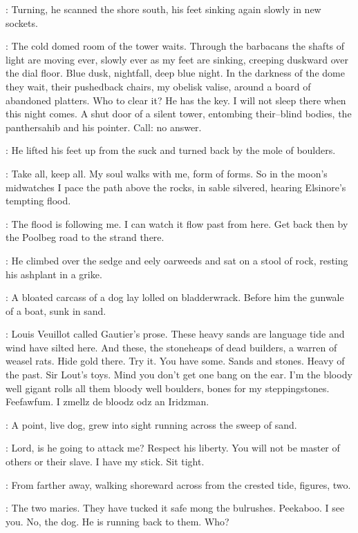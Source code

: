 :
Turning, he scanned the shore south,
his feet sinking again slowly in new sockets.

\StephenInt:
The cold domed room of the tower waits.
Through the barbacans
the shafts of light are moving ever,
slowly ever as my feet are sinking,
creeping duskward over the dial floor.
Blue dusk, nightfall, deep blue night.
In the darkness of the dome
they wait, their pushedback chairs,
my obelisk valise,
around a board of abandoned platters.
Who to clear it?
He has the key.
I will not sleep there when this night comes.
A shut door of a silent tower,
entombing their--blind bodies,
the panthersahib and his pointer.
Call:
no answer.

:
He lifted his feet up from the suck
and turned back by the mole of boulders.

\StephenInt:
Take all, keep all.
My soul walks with me, form of forms.
So in the moon's midwatches
I pace the path above the rocks,
in sable silvered, hearing Elsinore's tempting flood.

\StephenInt:
The flood is following me.
I can watch it flow past from here.
Get back then by the Poolbeg road to the strand there.

:
He climbed over the sedge and eely oarweeds
and sat on a stool of rock, resting his ashplant in a grike.

:
A bloated carcass of a dog lay lolled on bladderwrack.
Before him the gunwale of a boat, sunk in sand.

\StephenInt:
 Louis Veuillot called Gautier's prose.
These heavy sands are language tide and wind have silted here.
And these, the stoneheaps of dead builders, a warren of weasel rats.
Hide gold there.
Try it.
You have some.
Sands and stones.
Heavy of the past.
Sir Lout's toys.
Mind you don't get one bang on the ear.
I'm the bloody well gigant
rolls all them bloody well boulders,
bones for my steppingstones.
Feefawfum.
I zmellz de bloodz odz an Iridzman.

:
A point, live dog,
grew into sight running across the sweep of sand.

\StephenInt:
Lord, is he going to attack me?
Respect his liberty.
You will not be master of others or their slave.
I have my stick.
Sit tight.

:
From farther away,
walking shoreward across from the crested tide,
figures, two.

\StephenInt:
The two maries.
They have tucked it safe mong the bulrushes.
Peekaboo.
I see you.
No, the dog.
He is running back to them.
Who?

